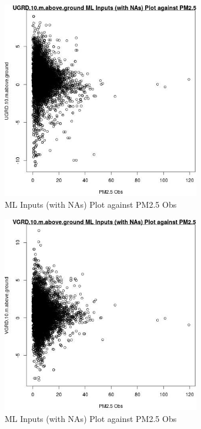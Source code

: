 \begin{figure} 
\centering  
\includegraphics[width=0.77\textwidth]{Code_Outputs/Report_ML_input_PM25_Step4_part_e_de_duplicated_aves_compiled_2019-05-18wNAs_UGRD10mabovegroundvPM25_Obs.jpg} 
\caption{\label{fig:Report_ML_input_PM25_Step4_part_e_de_duplicated_aves_compiled_2019-05-18wNAsUGRD10mabovegroundvPM25_Obs}ML Inputs (with NAs) Plot against PM2.5 Obs} 
\end{figure} 
 

\begin{figure} 
\centering  
\includegraphics[width=0.77\textwidth]{Code_Outputs/Report_ML_input_PM25_Step4_part_e_de_duplicated_aves_compiled_2019-05-18wNAs_VGRD10mabovegroundvPM25_Obs.jpg} 
\caption{\label{fig:Report_ML_input_PM25_Step4_part_e_de_duplicated_aves_compiled_2019-05-18wNAsVGRD10mabovegroundvPM25_Obs}ML Inputs (with NAs) Plot against PM2.5 Obs} 
\end{figure} 
 


